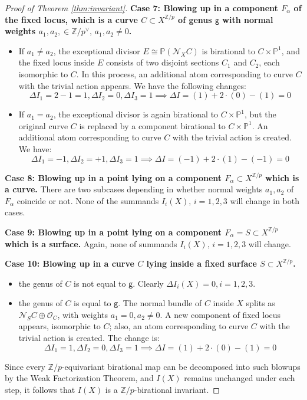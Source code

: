 \documentclass[12pt,a4paper]{amsart}
\theoremstyle{definition}
\theoremstyle{remark}
\newcommand{\Z}{\mathbb{Z}}
\begin{document}
\begin{proof}[Proof of Theorem \ref{thm:invariant}]
\medskip
\noindent\textbf{Case 7: Blowing up in a component $F_\alpha$ of the fixed locus, which is a curve \( C \subset X^{\mathbb{Z}/p} \) of genus $\mathsf g$ with normal weights $a_1,a_2,\in \Z/p^\vee,\,a_1,a_2\ne 0$.}
\begin{itemize}
    \item If \( a_1 \neq a_2 \), the exceptional divisor \( E \cong \mathbb{P}(\mathcal{N}_{X}C) \) is birational to \( C \times \mathbb{P}^1 \), and the fixed locus inside \( E \) consists of two disjoint sections \( C_1 \) and \( C_2 \), each isomorphic to \( C \). In this process, an additional atom corresponding to curve $C$ with the trivial action appears. We have the following changes:
    $$\Delta I_1=2-1=1,\Delta I_2=0,\Delta I_3=1\implies \Delta I=(1)+2\cdot(0)-(1)=0$$
    \item If \( a_1 = a_2 \), the exceptional divisor is again birational to \( C \times \mathbb{P}^1 \), but the original curve \( C \) is replaced by a component birational to \( C \times \mathbb{P}^1 \). An additional atom corresponding to curve $C$ with the trivial action is created. We have:
    \[
    \Delta I_1=-1,\Delta I_2=+1,\Delta I_3=1\implies \Delta I=(-1)+2\cdot (1)-(-1)=0
    \]
\end{itemize}

\medskip
\noindent\textbf{Case 8: Blowing up in a point lying on a component \(F_\alpha\subset X^{\mathbb{Z}/p} \)  which is a curve.} There are two subcases depending in whether normal weights  $a_1,a_2$ of $F_\alpha$ coincide or not. None of the summands $I_i(X),\,i=1,2,3$ will change in both cases.



\medskip

\noindent\textbf{Case 9: Blowing up in a point lying on a component \( F_\alpha=S \subset X^{\mathbb{Z}/p} \) which is a surface.} Again, none of summands $I_i(X),\,i=1,2,3$ will change.

\medskip
\noindent\textbf{Case 10: Blowing up in  a  curve \( C\) lying inside a fixed surface \( S \subset X^{\mathbb{Z}/p}\).} \\
\begin{itemize}
    \item the genus of $C$ is not equal to $\mathsf g$. Clearly $\Delta I_i(X)=0, i=1,2,3$.
    \item the genus of $C$ is equal to $\mathsf g$. The normal bundle of \( C \) inside \( X \) splits as \(\mathcal{N}_{S}C \oplus \mathcal{O}_C\), with weights $a_1=0,a_2\ne 0$. A new component of fixed locus appears, isomorphic to $C$; also, an atom corresponding to curve $C$ with the trivial action is created. The change is:
    $$\Delta I_1=1,\Delta I_2=0,\Delta I_3=1\implies \Delta I=(1)+2\cdot(0)-(1)=0$$
\end{itemize}

Since every \( \mathbb{Z}/p \)-equivariant birational map can be decomposed into such blowups by the Weak Factorization Theorem, and \( I(X) \) remains unchanged under each step, it follows that \( I(X) \) is a \(\mathbb{Z}/p\)-birational invariant.
\end{proof}
\end{document}
